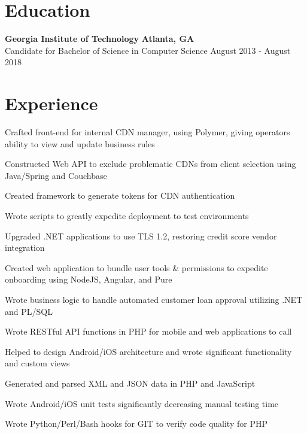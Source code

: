 \documentclass[line]{resume}
\begin{document}
\begin{center}
\end{center}
\section{Education}
\textbf{Georgia Institute of Technology} \hfill \textbf{Atlanta, GA} \\
Candidate for Bachelor of Science in Computer Science  \hfill August 2013 - August 2018
\section{Experience}
\begin{myitemize}
	\item Crafted front-end for internal CDN manager, using Polymer, giving operators ability to view and update business rules
	\item Constructed Web API to exclude problematic CDNs from client selection using Java/Spring and Couchbase
	\item Created framework to generate tokens for CDN authentication
\end{myitemize}

\begin{myitemize}
	\item Wrote scripts to greatly expedite deployment to test environments
	\item Upgraded .NET applications to use TLS 1.2, restoring credit score vendor integration
	\item Created web application to bundle user tools \& permissions to expedite onboarding using NodeJS, Angular, and Pure
	\item Wrote business logic to handle automated customer loan approval utilizing .NET and PL/SQL
\end{myitemize}

\begin{myitemize}
	\item Wrote RESTful API functions in PHP for mobile and web applications to call 
	\item Helped to design Android/iOS architecture and wrote significant functionality and custom views
	\item Generated and parsed XML and JSON data in PHP and JavaScript 
	\item Wrote Android/iOS unit tests significantly decreasing manual testing time 
	\item Wrote Python/Perl/Bash hooks for GIT to verify code quality for PHP
\end{myitemize}
\end{document}
